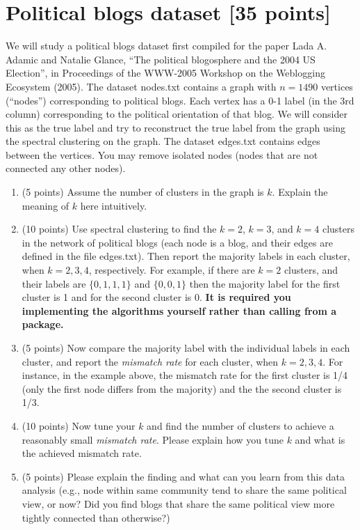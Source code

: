 \documentclass[twoside,10pt]{article}
\begin{document}
\section{Political blogs dataset [35 points] }

We will study a political blogs dataset first compiled for the paper Lada A. Adamic and Natalie Glance, ``The political blogosphere and the 2004 US Election'', in Proceedings of the WWW-2005 Workshop on the Weblogging Ecosystem (2005). The dataset \textsf{nodes.txt} contains a graph with $n = 1490$ vertices (``nodes'') corresponding to political blogs. Each vertex has a 0-1 label (in the 3rd column) corresponding to the political orientation of that blog. We will consider this as the true label and try to reconstruct the true label from the graph using the spectral clustering on the graph. The dataset \textsf{edges.txt} contains edges between the vertices. You may remove isolated nodes (nodes that are not connected any other nodes). 


\begin{enumerate}
\item (5 points)  Assume the number of clusters in the graph is $k$. Explain the meaning of $k$ here intuitively. 

\item (10 points) Use spectral clustering to find the $k = 2$, $k = 3$, and $k = 4$ clusters in the network of political blogs (each node is a blog, and their edges are defined in the file \textsf{edges.txt}). Then report the majority labels in each cluster, when $k = 2, 3, 4$, respectively. For example, if there are $k = 2$ clusters, and their labels are $\{0, 1, 1, 1\}$ and $\{0, 0, 1\}$ then the majority label for the first cluster is 1 and for the second cluster is 0. {\bf It is required you implementing the algorithms yourself rather than calling from a package.} 

\item (5 points) Now compare the majority label with the individual labels in each cluster, and report the {\it mismatch rate} for each cluster, when $k = 2, 3, 4$. For instance, in the example above, the mismatch rate for the first cluster is 1/4 (only the first node differs from the majority) and the the second cluster is 1/3. 

\item (10 points) Now tune your $k$ and find the number of clusters to achieve a reasonably small {\it mismatch rate}. Please explain how you tune $k$ and what is the achieved mismatch rate.  

\item (5 points) Please explain the finding and what can you learn from this data analysis (e.g., node within same community tend to share the same political view, or now? Did you find blogs that share the same political view more tightly connected than otherwise?)


\end{enumerate}
\end{document}
